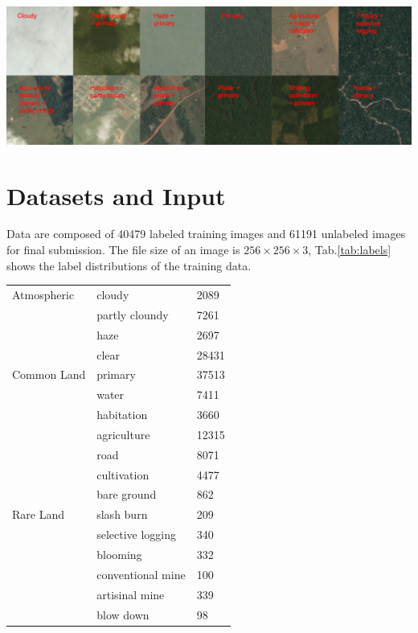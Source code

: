 \documentclass[11pt,oneside,a4paper]{article}
\newenvironment{Figure}
{\par\medskip\noindent\minipage{\linewidth}}
{\endminipage\par\medskip}
\begin{document}
\begin{multicols}{2}
\begin{Figure}
 \centering
 \includegraphics[width=\linewidth, height=0.4\linewidth]{chips.jpg}
 \label{fig:sample}
\end{Figure}

\section{Datasets and Input}
\label{S:3}
Data\cite{amazonkaggle} are composed of 40479 labeled training images and 61191 unlabeled images for final submission. The file size of an image is ${256\times 256 \times 3}$, Tab.\ref{tab:labels} shows the label distributions of the training data.

\small{
\begin{Figure}
\begin{tabularx}{1\columnwidth}{l|l|l}
\hline
\hline
Atmospheric & cloudy & 2089 \\ 
  & partly cloundy &  7261 \\  
  & haze &   2697 \\
  & clear &   28431 \\
\hline 
Common Land & primary & 37513 \\
 & water & 7411 \\
 & habitation & 3660 \\
 & agriculture & 12315 \\
 & road & 8071 \\
 & cultivation & 4477 \\
 & bare ground & 862 \\
\hline
Rare Land & slash burn & 209 \\
 & selective logging & 340 \\
 & blooming & 332 \\
 & conventional mine & 100 \\
 & artisinal mine & 339 \\
 & blow down & 98 \\ \hline
\end{tabularx}
\label{tab:labels}
\end{Figure}
}



\end{multicols}
\end{document}
